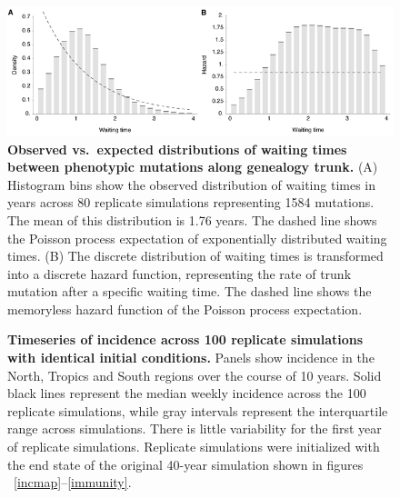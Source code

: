 \documentclass[11pt,oneside,letterpaper]{article}
\begin{document}
\begin{figure}[c]
	\centering
	\includegraphics{figures/waittimes}
	\caption{\textbf{Observed vs.\ expected distributions of waiting times between phenotypic mutations along genealogy trunk.} (A) Histogram bins show the observed distribution of waiting times in years across 80 replicate simulations representing 1584 mutations.  The mean of this distribution is 1.76 years.  The dashed line shows the Poisson process expectation of exponentially distributed waiting times.  (B) The discrete distribution of waiting times is transformed into a discrete hazard function, representing the rate of trunk mutation after a specific waiting time.  The dashed line shows the memoryless hazard function of the Poisson process expectation.}
	\label{waittimes}
\end{figure}

\pagebreak

\begin{figure}[c]
	\centering
	\caption{\textbf{Timeseries of incidence across 100 replicate simulations with identical initial conditions.} Panels show incidence in the North, Tropics and South regions over the course of 10 years.  Solid black lines represent the median weekly incidence across the 100 replicate simulations, while gray intervals represent the interquartile range across simulations.  There is little variability for the first year of replicate simulations.  Replicate simulations were initialized with the end state of the original 40-year simulation shown in figures ~\ref{incmap}--\ref{immunity}.}
	\label{replicatetimeseries}
\end{figure}
\end{document}
